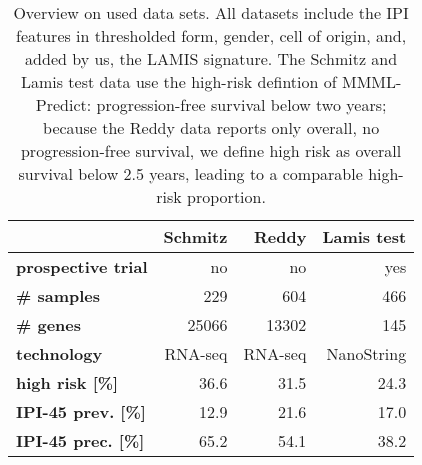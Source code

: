 \begin{table}
    \centering
    \begin{tabular}{lrrr}
        \hline
        & \textbf{Schmitz \cite{schmitz18}} & \textbf{Reddy \cite{reddy17}} & \textbf{Lamis test \cite{staiger20}} \\
        \hline
        \textbf{prospective trial} & no & no & yes \\
        \textbf{\# samples} & \num{229} & \num{604} & \num{466} \\
        \textbf{\# genes} & \num{25066} & \num{13302} & \num{145} \\
        \textbf{technology} & RNA-seq & RNA-seq & NanoString \\
        \textbf{high risk [\%]} & \num{36.6} & \num{31.5}\footnotemark & \num{24.3} \\
        \textbf{IPI-45 prev. [\%]} & \num{12.9} & \num{21.6} & \num{17.0} \\
        \textbf{IPI-45 prec. [\%]} & \num{65.2} & \num{54.1} & \num{38.2} \\
        \hline
    \end{tabular}
    \caption{Overview on used data sets. All datasets include the IPI features in thresholded form, 
        gender, cell of origin, and, added by us, the LAMIS signature. The Schmitz and Lamis test 
        data use the high-risk defintion of MMML-Predict: progression-free survival below two years; 
        because the Reddy data reports only overall, no progression-free survival, we define high risk 
        as overall survival below \num{2.5} years, leading to a comparable high-risk proportion.}
        \label{table:data}
\end{table}